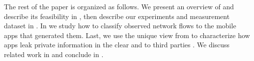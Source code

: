 
The rest of the paper is organized as follows. 
We present an overview of \platname and describe its feasibility in , then describe our experiments and measurement dataset in .
In   we study how to classify observed network flows to the mobile apps that generated them. Last, we use the 
unique view from \platname to characterize how apps leak private information in the clear and to third parties . 
We discuss related work in  and conclude in .

